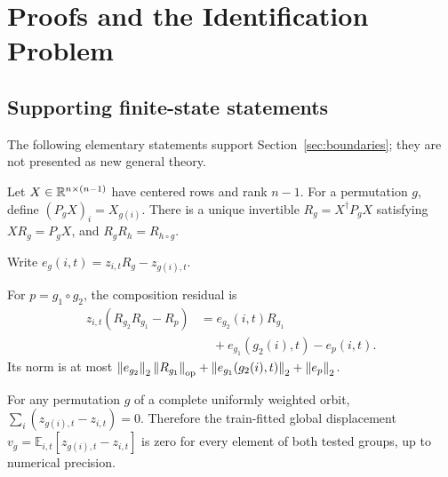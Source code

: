 \section{Proofs and the Identification Problem}
\label{app:theory}
\label{sec:appendix}
\subsection{Supporting finite-state statements}
The following elementary statements support Section~\ref{sec:boundaries}; they are not presented as new general theory.

\begin{proposition}
\label{prop:finite}
Let $X\in\mathbb{R}^{n\times(n-1)}$ have centered rows and rank $n-1$. For a permutation $g$, define $(P_gX)_i=X_{g(i)}$. There is a unique invertible $R_g=X^\dagger P_gX$ satisfying $XR_g=P_gX$, and $R_gR_h=R_{h\circ g}$.
\end{proposition}

Write $e_g(i,t)=z_{i,t}R_g-z_{g(i),t}$.
\begin{proposition}
\label{prop:propagation}
For $p=g_1\circ g_2$, the composition residual is
\begin{align}
 z_{i,t}(R_{g_2}R_{g_1}-R_p)
 &=e_{g_2}(i,t)R_{g_1} \nonumber\\
 &\quad+e_{g_1}(g_2(i),t)-e_p(i,t).
\end{align}
Its norm is at most $\left\lVert e_{g_2}\right\rVert_2\left\lVert R_{g_1}\right\rVert_{\rm op}+\left\lVert e_{g_1}(g_2(i),t)\right\rVert_2+\left\lVert e_p\right\rVert_2$.
\end{proposition}

\begin{proposition}
\label{prop:additive}
For any permutation $g$ of a complete uniformly weighted orbit, $\sum_i(z_{g(i),t}-z_{i,t})=0$. Therefore the train-fitted global displacement $v_g=\mathbb{E}_{i,t}[z_{g(i),t}-z_{i,t}]$ is zero for every element of both tested groups, up to numerical precision.
\end{proposition}

